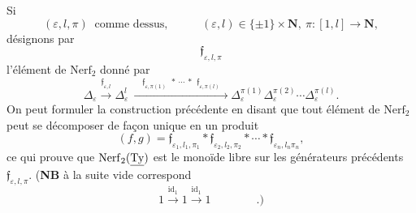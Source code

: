 Si
\[
(\varepsilon,l,\pi)\ \text{ comme dessus,} \qquad\quad (\varepsilon,l)\in\{\pm1\}\times\mathbf{N},\ \pi : [1,l]\longrightarrow\mathbf{N},
\]
désignons par
\[
\mathfrak{f}_{\varepsilon,l,\pi}
\]
l'élément de $\mathrm{Nerf}_2$ donné par
\[
\Delta_\varepsilon\xrightarrow{\mathfrak{f}_{\varepsilon,l}}\Delta^l_\varepsilon\ \xrightarrow{\quad\mathfrak{f}_{\varepsilon,\pi(1)}\ \ *\ \cdots\ *\ \ \mathfrak{f}_{\varepsilon,\pi(l)}\quad}\Delta^{\pi(1)}_\varepsilon\Delta^{\pi(2)}_\varepsilon\cdots\Delta^{\pi(l)}_\varepsilon.
\]
On peut formuler la construction précédente en disant que tout élément de $\mathrm{Nerf}_2$ peut se décomposer de façon unique en un produit
\[
(f,g) = \mathfrak{f}_{\varepsilon_1,l_1,\pi_1}*\mathfrak{f}_{\varepsilon_2,l_2,\pi_2}*\cdots*\mathfrak{f}_{\varepsilon_n,l_n\pi_n}, %
\]
ce qui prouve que $\mathrm{Nerf}_2(\underline{\mathrm{Ty}})$ est le monoïde libre sur les générateurs précédents $\mathfrak{f}_{\varepsilon,l,\pi}$. (\textbf{NB} à la suite vide correspond
\[
1\xrightarrow{\mathrm{id}_1}1\xrightarrow{\mathrm{id}_1}1 \qquad\qquad .)
\]

